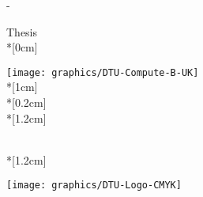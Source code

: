\thispagestyle{empty}             %
\calccentering{\unitlength}
\begin{adjustwidth*}{\unitlength}{-\unitlength}
    \begin{adjustwidth}{-0.5cm}{-0.5cm}
        \sffamily
        \begin{flushright}
            \thesistypeabbr{} Thesis\\*[0cm]
            \thesistype{}\\
        \end{flushright}
        \vspace*{\fill}
        \noindent
        \texttt{[image: graphics/DTU-Compute-B-UK]}\\*[1cm]
        \HUGE \thesistitle{}\\*[0.2cm]
        \Huge \thesissubtitle{}\\*[1.2cm]
        \parbox[b]{0.5\linewidth}{%
            \large \thesisauthor{}\\*[1.2cm]
            \small \thesislocation{} \thesisyear{}\\
            \small \thesisnumber{}
        }
        \hfill\texttt{[image: graphics/DTU-Logo-CMYK]}
    \end{adjustwidth}
\end{adjustwidth*}
\normalfont
\normalsize
